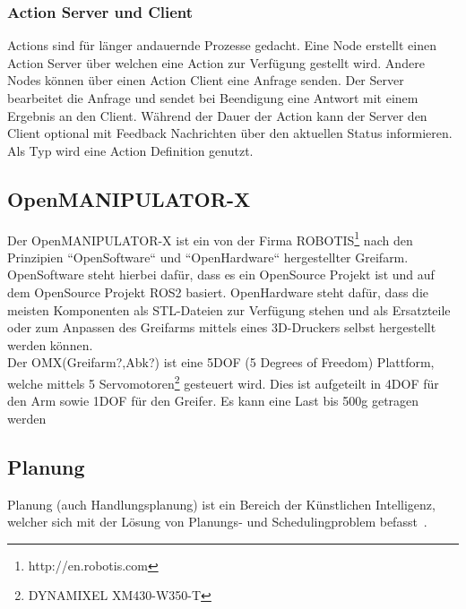 \subsubsection{Action Server und Client}
Actions sind für länger andauernde Prozesse gedacht.
Eine Node erstellt einen Action Server über welchen eine Action zur Verfügung gestellt wird.
Andere Nodes können über einen Action Client eine Anfrage senden.
Der Server bearbeitet die Anfrage und sendet bei Beendigung eine Antwort mit einem Ergebnis an den Client.
Während der Dauer der Action kann der Server den Client optional mit Feedback Nachrichten über den aktuellen Status informieren.\\
Als Typ wird eine Action Definition genutzt. 
\subsection{OpenMANIPULATOR-X}
Der OpenMANIPULATOR-X ist ein von der Firma ROBOTIS{\footnote{http://en.robotis.com}} nach den Prinzipien ``OpenSoftware`` und ``OpenHardware`` hergestellter Greifarm.
OpenSoftware steht hierbei dafür, dass es ein OpenSource Projekt ist und auf dem OpenSource Projekt \ac{ROS2} basiert.
OpenHardware steht dafür, dass die meisten Komponenten als STL-Dateien zur Verfügung stehen und als Ersatzteile oder zum Anpassen des Greifarms mittels eines 3D-Druckers selbst hergestellt werden können.\\
Der OMX(Greifarm?,Abk?) ist eine 5DOF (5 Degrees of Freedom) Plattform, welche mittels 5 Servomotoren{\footnote{DYNAMIXEL XM430-W350-T}} gesteuert wird.
Dies ist aufgeteilt in 4DOF für den Arm sowie 1DOF für den Greifer.
Es kann eine Last bis 500g getragen werden
\subsection {Planung}
Planung (auch Handlungsplanung) ist ein Bereich der Künstlichen Intelligenz, welcher sich mit der Lösung von Planungs- und Schedulingproblem befasst~\cite{aiplanning}.
